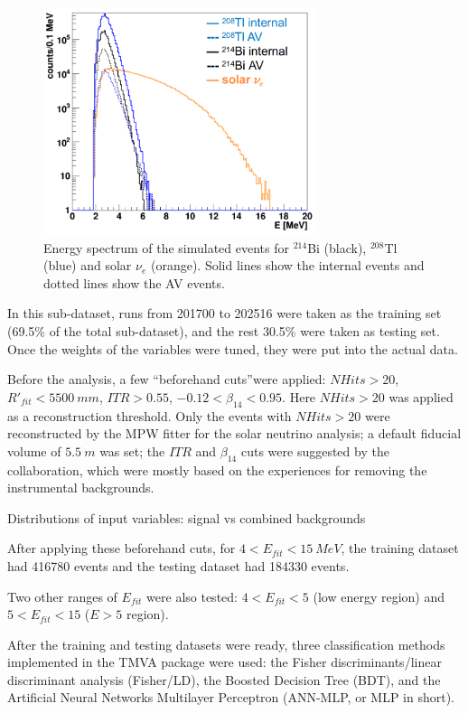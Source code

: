 \begin{figure}[!htb]
	\centering
	\includegraphics[width=8cm]{TMVA_bkgs_1.png}
	\caption{Energy spectrum of the simulated events for $^{214}$Bi (black), $^{208}$Tl (blue) and solar $\nu_e$ (orange). Solid lines show the internal events and dotted lines show the AV events.}
	\label{TMVA_bkgs_1}
\end{figure}

In this sub-dataset, runs from 201700 to 202516 were taken as the training set (69.5\% of the total sub-dataset), and the rest 30.5\% were taken as testing set. Once the weights of the variables were tuned, they were put into the actual data.

Before the analysis, a few ``beforehand cuts''were applied: $NHits>20$, $R'_{fit}<5500~mm$, $ITR>0.55$, $-0.12<\beta_{14}<0.95$. Here $NHits>20$ was applied as a reconstruction threshold. Only the events with $NHits>20$ were reconstructed by the MPW fitter for the solar neutrino analysis; a default fiducial volume of $5.5~m$ was set; the $ITR$ and $\beta_{14}$ cuts were suggested by the collaboration, which were mostly based on the experiences for removing the instrumental backgrounds\cite{waterunidoc}. 

Distributions of input variables:
signal vs combined backgrounds



After applying these beforehand cuts, for $4<E_{fit}<15~MeV$, the training dataset had 416780 events and the testing dataset had 184330 events.

Two other ranges of $E_{fit}$ were also tested: $4<E_{fit}<5$ (low energy region) and $5<E_{fit}<15$ ($E>5$ region). %

After the training and testing datasets were ready, three classification methods implemented in the TMVA package were used: the Fisher discriminants/linear discriminant analysis (Fisher/LD), the Boosted Decision Tree (BDT), and the Artificial Neural Networks Multilayer Perceptron (ANN-MLP, or MLP in short)\cite{albertsson2007tmva}.

